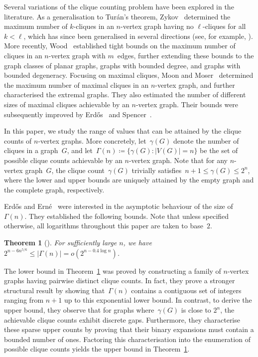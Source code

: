 \documentclass[11pt, final]{article}
\newtheorem{theorem}{Theorem}[section]
\theoremstyle{definition}
\begin{document}
Several variations of the clique counting problem have been explored in the literature. 
As a generalisation to Tur\'{a}n's theorem, Zykov~\cite{zykov} determined the maximum number of $k$-cliques in an $n$-vertex graph having no $\ell$-cliques for all $k < \ell$, which has since been generalised in several directions (see, for example, \cite{Eckhoff, erdos_circuit, Fisher_Ryan}). More recently, Wood~\cite{wood_cliques} established tight bounds on the maximum number of cliques in an $n$-vertex graph with $m$~edges, further extending these bounds to the graph classes of planar graphs, graphs with bounded degree, and graphs with bounded degeneracy. Focusing on maximal cliques, Moon and Moser~\cite{moon_moser} determined the maximum number of maximal cliques in an $n$-vertex graph, and further characterised the extremal graphs. They also estimated the number of different sizes of maximal cliques achievable by an $n$-vertex graph. Their bounds were subsequently improved by Erd\H{o}s~\cite{Erdos_cliques} and Spencer~\cite{Spencer_cliques}. 

In this paper, we study the range of values that can be attained by the clique counts of $n$-vertex graphs. More concretely, let~$\gamma(G)$ denote the number of cliques in a graph~$G$, and let~$\Gamma(n) \coloneqq \{\gamma(G) : |V(G)| = n\}$ be the set of possible clique counts achievable by an $n$-vertex graph. Note that for any $n$-vertex graph~$G$, the clique count~$\gamma(G)$ trivially satisfies~$n+1 \leq \gamma(G) \leq 2^n$, where the lower and upper bounds are uniquely attained by the empty graph and the complete graph, respectively.

Erd\H{o}s and Ern\'{e}~\cite{erdos_erne_orig} were interested in the asymptotic behaviour of the size of~$\Gamma(n)$. They established the following bounds. Note that unless specified otherwise, all logarithms throughout this paper are taken to base~$2$.

\begin{theorem}[\cite{erdos_erne_orig}]
\label{thm:erdos_erne}
    For sufficiently large $n$, we have $2^{n-6n^{5/6}}\leq |\Gamma(n)| = o(2^{n - 0.4\log n})$.
\end{theorem}

The lower bound in Theorem~\ref{thm:erdos_erne} was proved by constructing a family of $n$-vertex graphs having pairwise distinct clique counts. In fact, they prove a stronger structural result by showing that~$\Gamma(n)$ contains a contiguous set of integers ranging from $n+1$ up to this exponential lower bound. In contrast, to derive the upper bound, they observe that for graphs where~$\gamma(G)$ is close to $2^n$, the achievable clique counts exhibit discrete gaps. Furthermore, they characterise these sparse upper counts by proving that their binary expansions must contain a bounded number of ones. Factoring this characterisation into the enumeration of possible clique counts yields the upper bound in Theorem~\ref{thm:erdos_erne}.
\end{document}
